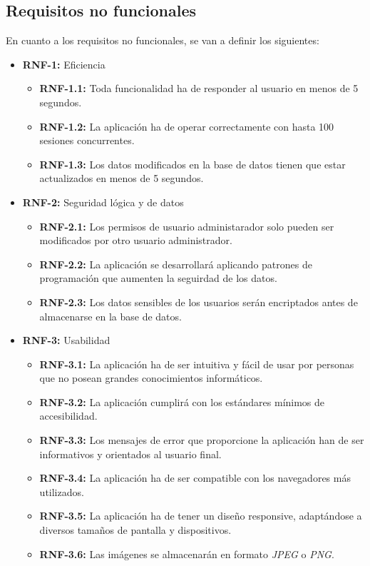 \subsection{Requisitos no funcionales}
En cuanto a los requisitos no funcionales, se van a definir los siguientes:

\begin{itemize}
    \item \textbf{RNF-1:} Eficiencia
    \begin{itemize}
        \item \textbf{RNF-1.1:} Toda funcionalidad ha de responder al usuario en menos
        de 5 segundos.
        \item \textbf{RNF-1.2:} La aplicación ha de operar correctamente con hasta 100
        sesiones concurrentes.
        \item \textbf{RNF-1.3:} Los datos modificados en la base de datos tienen que
        estar actualizados en menos de 5 segundos.
    \end{itemize}
    \item \textbf{RNF-2:} Seguridad lógica y de datos
    \begin{itemize}
        \item \textbf{RNF-2.1:} Los permisos de usuario administarador solo pueden ser
        modificados por otro usuario administrador.
        \item \textbf{RNF-2.2:} La aplicación se desarrollará aplicando patrones de
        programación que aumenten la seguirdad de los datos.
        \item \textbf{RNF-2.3:} Los datos sensibles de los usuarios serán encriptados
        antes de almacenarse en la base de datos.
    \end{itemize}
    \item \textbf{RNF-3:} Usabilidad
    \begin{itemize}
        \item \textbf{RNF-3.1:} La aplicación ha de ser intuitiva y fácil de usar por
        personas que no posean grandes conocimientos informáticos.
        \item \textbf{RNF-3.2:} La aplicación cumplirá con los estándares mínimos de
        accesibilidad.
        \item \textbf{RNF-3.3:} Los mensajes de error que proporcione la aplicación
        han de ser informativos y orientados al usuario final.
        \item \textbf{RNF-3.4:} La aplicación ha de ser compatible con los navegadores
        más utilizados.
        \item \textbf{RNF-3.5:} La aplicación ha de tener un diseño responsive, adaptándose
        a diversos tamaños de pantalla y dispositivos.
        \item \textbf{RNF-3.6:} Las imágenes se almacenarán en formato \textit{JPEG} o
        \textit{PNG}.
    \end{itemize}
\end{itemize}

